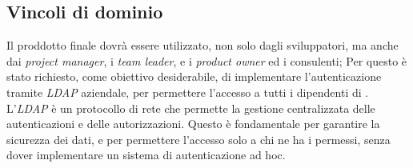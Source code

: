 \subsection*{ Vincoli di dominio}
Il proddotto finale dovrà essere utilizzato, non solo dagli sviluppatori, ma anche dai \textit{project manager}, i \textit{team leader}, e i \textit{product owner} ed
i consulenti; Per questo è stato richiesto, come obiettivo desiderabile, di implementare l'autenticazione tramite \textit{LDAP} aziendale, 
per permettere l'accesso a tutti i dipendenti di {\azienda}.\\
L'\textit{LDAP} è un protocollo di rete che permette la gestione centralizzata delle autenticazioni e delle autorizzazioni.
Questo è fondamentale per garantire la sicurezza dei dati, e per permettere l'accesso solo a chi ne ha i permessi, senza dover
implementare un sistema di autenticazione ad hoc.\\
